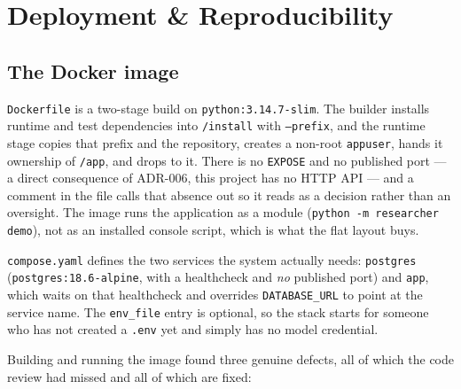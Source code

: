 \documentclass[10pt,a4paper]{article}
\begin{document}
\section{Deployment \& Reproducibility}

\subsection{The Docker image}
\label{sec:docker}

\texttt{Dockerfile} is a two-stage build on \texttt{python:3.14.7-slim}. The builder installs
runtime and test dependencies into \texttt{/install} with \texttt{--prefix}, and the runtime
stage copies that prefix and the repository, creates a non-root \texttt{appuser}, hands it
ownership of \texttt{/app}, and drops to it. There is no \texttt{EXPOSE} and no published port --- a direct
consequence of ADR-006, this project has no HTTP API --- and a comment in the file calls that
absence out so it reads as a decision rather than an oversight. The
image runs the application as a module (\texttt{python -m researcher demo}), not as an installed
console script, which is what the flat layout buys.

\texttt{compose.yaml} defines the two services the system actually needs: \texttt{postgres}
(\texttt{postgres:18.6-alpine}, with a healthcheck and \emph{no} published port) and
\texttt{app}, which waits on that healthcheck and overrides \texttt{DATABASE\_URL} to point at
the service name. The \texttt{env\_file} entry is optional, so the stack starts for someone who
has not created a \texttt{.env} yet and simply has no model credential.

Building and running the image found three genuine defects, all of which the code review had
missed and all of which are fixed:
\end{document}
